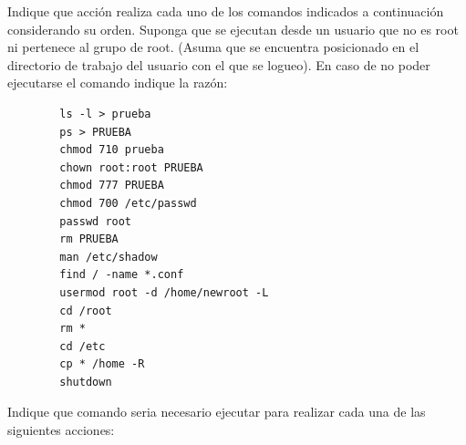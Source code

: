 \begin{questions}

\question Indique que acción realiza cada uno de los comandos indicados a continuación considerando su orden. Suponga que se ejecutan desde un usuario que no es root ni pertenece al grupo de root. (Asuma que se encuentra posicionado en el directorio de trabajo del usuario con el que se logueo). En caso de no poder ejecutarse el comando indique la razón:
\begin{lstlisting}
		ls -l > prueba
		ps > PRUEBA
		chmod 710 prueba
		chown root:root PRUEBA
		chmod 777 PRUEBA
		chmod 700 /etc/passwd
		passwd root
		rm PRUEBA
		man /etc/shadow
		find / -name *.conf
		usermod root -d /home/newroot -L
		cd /root
		rm *
		cd /etc
		cp * /home -R
		shutdown
\end{lstlisting}

\question Indique que comando seria necesario ejecutar para realizar cada una de las siguientes acciones:
\end{questions}

